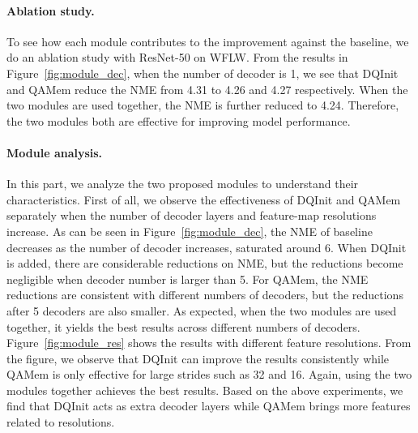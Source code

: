 \documentclass{article}
\begin{document}
\paragraph{Ablation study.}

To see how each module contributes to the improvement against the baseline, we do an ablation study with ResNet-50 on WFLW. From the results in Figure~\ref{fig:module_dec}, when the number of decoder is 1, we see that DQInit and QAMem reduce the NME from 4.31 to 4.26 and 4.27 respectively. When the two modules are used together, the NME is further reduced to 4.24. Therefore, the two modules both are effective for improving model performance.

\paragraph{Module analysis.}

In this part, we analyze the two proposed modules to understand their characteristics. First of all, we observe the effectiveness of DQInit and QAMem separately when the number of decoder layers and feature-map resolutions increase. As can be seen in Figure~\ref{fig:module_dec}, the NME of baseline decreases as the number of decoder increases, saturated around 6. When DQInit is added, there are considerable reductions on NME, but the reductions become negligible when decoder number is larger than 5. For QAMem, the NME reductions are consistent with different numbers of decoders, but the reductions after 5 decoders are also smaller. As expected, when the two modules are used together, it yields the best results across different numbers of decoders. Figure~\ref{fig:module_res} shows the results with different feature resolutions. From the figure, we observe that DQInit can improve the results consistently while QAMem is only effective for large strides such as 32 and 16. Again, using the two modules together achieves the best results. Based on the above experiments, we find that DQInit acts as extra decoder layers while QAMem brings more features related to resolutions.
\end{document}
